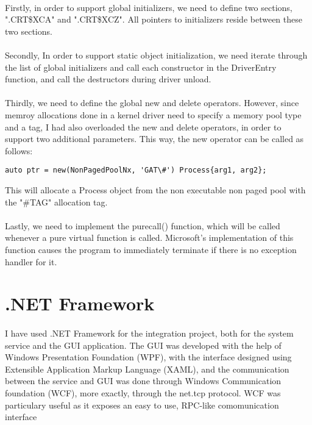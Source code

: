         \paragraph{}
        Firstly, in order to support global initializers, we need to define two sections, ".CRT\$XCA" and ".CRT\$XCZ". All pointers to 
        initializers reside between these two sections.

        \paragraph{}
        Secondly, In order to support static object initialization, we need iterate through the list of global initializers and call each
        constructor in the DriverEntry function, and call the destructors during driver unload.

        \paragraph{}
        Thirdly, we need to define the global new and delete operators. However, since memroy allocations done in a kernel driver need to specify
        a memory pool type and a tag, I had also overloaded the new and delete operators, in order to support two additional parameters. This
        way, the new operator can be called as follows:


        \begin{Verbatim}
auto ptr = new(NonPagedPoolNx, 'GAT\#') Process{arg1, arg2};
        \end{Verbatim}

        This will allocate a Process object from the non executable non paged pool with the "\#TAG" allocation tag.


        \paragraph{}
        Lastly, we need to implement the \textunderscore purecall() function, which will be called whenever a pure virtual function is called.
        Microsoft's implementation of this function causes the program to immediately terminate if there is no exception handler for it.

    \section{.NET Framework}
        \paragraph{}
        I have used .NET Framework for the integration project, both for the system service and the GUI application. The GUI was developed with
        the help of Windows Presentation Foundation (WPF), with the interface designed using Extensible Application Markup Language (XAML), and
        the communication between the service and GUI was done through Windows Communication foundation (WCF), more exactly, through the
        net.tcp protocol. WCF was particulary useful as it exposes an easy to use, RPC-like comomunication interface

